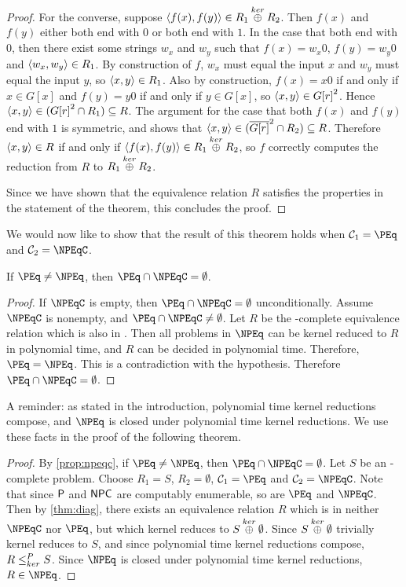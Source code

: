 \begin{proof}
  For the converse, suppose $\pair{f(x)}{f(y)}\in R_1\kj R_2$.
  Then $f(x)$ and $f(y)$ either both end with $0$ or both end with $1$.
  In the case that both end with $0$, then there exist some strings $w_x$ and $w_y$ such that $f(x)=w_x0$, $f(y)=w_y0$ and $\pair{w_x}{w_y}\in R_1$.
  By construction of $f$, $w_x$ must equal the input $x$ and $w_y$ must equal the input $y$, so $\pair{x}{y}\in R_1$.
  Also by construction, $f(x)=x0$ if and only if $x\in G[x]$ and $f(y)=y0$ if and only if $y\in G[x]$, so $\pair{x}{y}\in{G[r]}^2$.
  Hence $\pair{x}{y}\in({G[r]}^2\cap R_1)\subseteq R$.
  The argument for the case that both $f(x)$ and $f(y)$ end with $1$ is symmetric, and shows that $\pair{x}{y}\in(\overline{G[r]}^2\cap R_2)\subseteq R$.
  Therefore $\pair{x}{y}\in R$ if and only if $\pair{f(x)}{f(y)}\in R_1\kj R_2$, so $f$ correctly computes the reduction from $R$ to $R_1\kj R_2$.

  Since we have shown that the equivalence relation $R$ satisfies the properties in the statement of the theorem, this concludes the proof.
\end{proof}

We would now like to show that the result of this theorem holds when $\mathcal{C}_1=\PEq$ and $\mathcal{C}_2=\NPEqC$.

\begin{proposition}\label{prop:npeqc}
  If $\PEq \neq \NPEq$, then $\PEq \cap \NPEqC = \emptyset$.
\end{proposition}
\begin{proof}
  If $\NPEqC$ is empty, then $\PEq \cap \NPEqC = \emptyset$ unconditionally.
  Assume $\NPEqC$ is nonempty, and $\PEq \cap \NPEqC \neq \emptyset$.
  Let $R$ be the \NPEq-complete equivalence relation which is also in \PEq.
  Then all problems in $\NPEq$ can be kernel reduced to $R$ in polynomial time, and $R$ can be decided in polynomial time.
  Therefore, $\PEq=\NPEq$.
  This is a contradiction with the hypothesis.
  Therefore $\PEq\cap\NPEqC=\emptyset$.
\end{proof}

A reminder: as stated in the introduction, polynomial time kernel reductions compose, and $\NPEq$ is closed under polynomial time kernel reductions.
We use these facts in the proof of the following theorem.

\intermediary
\begin{proof}
  By \autoref{prop:npeqc}, if $\PEq \neq \NPEq$, then $\PEq \cap \NPEqC = \emptyset$.
  Let $S$ be an \NPEq-complete problem.
  Choose $R_1=S$, $R_2=\emptyset$, $\mathcal{C}_1=\PEq$ and $\mathcal{C}_2=\NPEqC$.
  Note that since $\P$ and $\NPC$ are computably enumerable, so are $\PEq$ and $\NPEqC$.
  Then by \autoref{thm:diag}, there exists an equivalence relation $R$ which is in neither $\NPEqC$ nor $\PEq$, but which kernel reduces to $S\kj\emptyset$.
  Since $S\kj\emptyset$ trivially kernel reduces to $S$, and since polynomial time kernel reductions compose, $R\kr S$.
  Since $\NPEq$ is closed under polynomial time kernel reductions, $R\in\NPEq$.
\end{proof}

